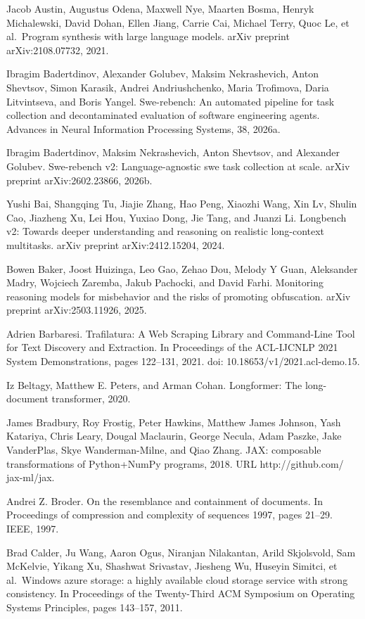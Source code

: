 \documentclass[
  10
]{article}
\begin{document}
Jacob Austin, Augustus Odena, Maxwell Nye, Maarten Bosma, Henryk
Michalewski, David Dohan, Ellen Jiang, Carrie Cai, Michael Terry, Quoc
Le, et al.~Program synthesis with large language models. arXiv preprint
arXiv:2108.07732, 2021.

Ibragim Badertdinov, Alexander Golubev, Maksim Nekrashevich, Anton
Shevtsov, Simon Karasik, Andrei Andriushchenko, Maria Trofimova, Daria
Litvintseva, and Boris Yangel. Swe-rebench: An automated pipeline for
task collection and decontaminated evaluation of software engineering
agents. Advances in Neural Information Processing Systems, 38, 2026a.

Ibragim Badertdinov, Maksim Nekrashevich, Anton Shevtsov, and Alexander
Golubev. Swe-rebench v2: Language-agnostic swe task collection at scale.
arXiv preprint arXiv:2602.23866, 2026b.

Yushi Bai, Shangqing Tu, Jiajie Zhang, Hao Peng, Xiaozhi Wang, Xin Lv,
Shulin Cao, Jiazheng Xu, Lei Hou, Yuxiao Dong, Jie Tang, and Juanzi Li.
Longbench v2: Towards deeper understanding and reasoning on realistic
long-context multitasks. arXiv preprint arXiv:2412.15204, 2024.

Bowen Baker, Joost Huizinga, Leo Gao, Zehao Dou, Melody Y Guan,
Aleksander Madry, Wojciech Zaremba, Jakub Pachocki, and David Farhi.
Monitoring reasoning models for misbehavior and the risks of promoting
obfuscation. arXiv preprint arXiv:2503.11926, 2025.

Adrien Barbaresi. Trafilatura: A Web Scraping Library and Command-Line
Tool for Text Discovery and Extraction. In Proceedings of the ACL-IJCNLP
2021 System Demonstrations, pages 122--131, 2021. doi:
10.18653/v1/2021.acl-demo.15.

Iz Beltagy, Matthew E. Peters, and Arman Cohan. Longformer: The
long-document transformer, 2020.

James Bradbury, Roy Frostig, Peter Hawkins, Matthew James Johnson, Yash
Katariya, Chris Leary, Dougal Maclaurin, George Necula, Adam Paszke,
Jake VanderPlas, Skye Wanderman-Milne, and Qiao Zhang. JAX: composable
transformations of Python+NumPy programs, 2018. URL http://github.com/
jax-ml/jax.

Andrei Z. Broder. On the resemblance and containment of documents. In
Proceedings of compression and complexity of sequences 1997, pages
21--29. IEEE, 1997.

Brad Calder, Ju Wang, Aaron Ogus, Niranjan Nilakantan, Arild Skjolsvold,
Sam McKelvie, Yikang Xu, Shashwat Srivastav, Jiesheng Wu, Huseyin
Simitci, et al.~Windows azure storage: a highly available cloud storage
service with strong consistency. In Proceedings of the Twenty-Third ACM
Symposium on Operating Systems Principles, pages 143--157, 2011.
\end{document}
